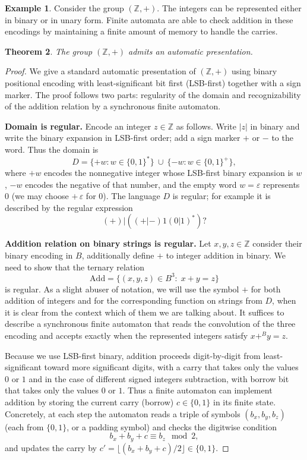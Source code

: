 \documentclass{pracalicmgr2025}
\theoremstyle{plain}            %
\newtheorem{theorem}{Theorem}[chapter]
\theoremstyle{remark}           %
\theoremstyle{definition}       %
\newtheorem{example}[theorem]{Example}
\begin{document}
\begin{example}
Consider the group $(\mathbb{Z}, +)$.  
The integers can be represented either in binary or in unary form.  
Finite automata are able to check addition in these encodings by maintaining a finite amount of memory 
to handle the carries. 
\end{example}

\begin{theorem}
    The group $(\mathbb{Z},+)$ admits an automatic presentation.
\end{theorem}

\begin{proof}
We give a standard automatic presentation of $(\mathbb{Z},+)$ using binary positional encoding with least-significant bit first (LSB-first) together with a sign marker. The proof follows two parts: regularity of the domain and recognizability of the addition relation by a synchronous finite automaton.

\medskip

\noindent\textbf{Domain is regular.} 
Encode an integer $z\in\mathbb{Z}$ as follows. Write $|z|$ in binary and write the binary expansion in LSB-first order; add a sign marker $+$ or $-$ to the word. Thus the domain is
\[
D = \{+w : w\in\{0,1\}^*\}\ \cup\ \{-w : w\in\{0,1\}^+\},
\]
where $+w$ encodes the nonnegative integer whose LSB-first binary expansion is $w$, $-w$ encodes the negative of that number, and the empty word $w=\varepsilon$ represents $0$ (we may choose $+\,\varepsilon$ for $0$). The language $D$ is regular; for example it is described by the regular expression
\[
(+ )| ((+|-) 1 (0|1)^*)?
\]

\medskip

\noindent\textbf{Addition relation on binary strings is regular.}
Let $x,y,z\in\mathbb{Z}$ consider their binary encoding in $B$, additionally define $+$ to integer addition in binary. We need to show that the ternary relation
\[
\mathrm{Add}=\{(x,y,z)\in B^3:\; x+y=z\}
\]
is regular. As a slight abuser of notation, we will use the symbol $+$ for both addition of integers and for the corresponding function on strings from $D$, when it is clear from the context which of them we are talking about. It suffices to describe a synchronous finite automaton that reads the convolution of the three encoding and accepts exactly when the represented integers satisfy $x+^By=z$.

Because we use LSB-first binary, addition proceeds digit-by-digit from least-significant toward more significant digits, with a carry that takes only the values $0$ or $1$ and in the case of different signed integers subtraction, with borrow bit that takes only the values $0$ or $1$. Thus a finite automaton can implement addition by storing the current carry (borrow) $c\in\{0,1\}$ in its finite state. Concretely, at each step the automaton reads a triple of symbols $(b_x,b_y,b_z)$ (each from $\{0,1\}$, or a padding symbol) and checks the digitwise condition
\[
b_x + b_y + c \equiv b_z \mod 2,
\]
and updates the carry by $c'=\big\lfloor (b_x+b_y+c)/2\big\rfloor\in\{0,1\}$.


\end{proof}
\end{document}
